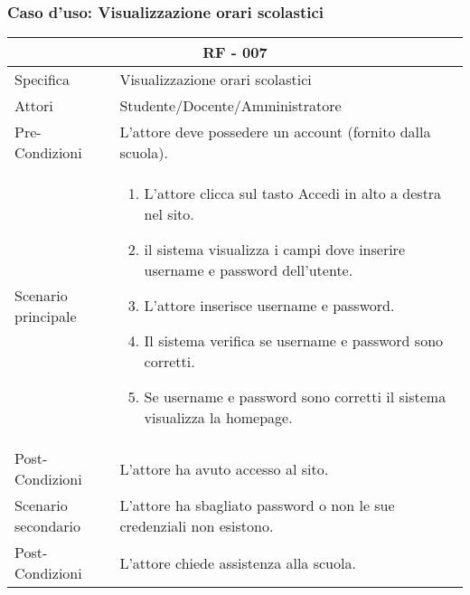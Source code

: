 \documentclass{article}
\begin{document}
\subsubsection{\textbf{Caso d'uso: Visualizzazione orari scolastici}}
\begin{tabular}{ |p{3cm}|p{9cm}|  }
	\hline
	\multicolumn{2}{|c|}{\textbf{RF - 007}} \\
	\hline
	Specifica& Visualizzazione orari scolastici\\
	\hline
	Attori& Studente/Docente/Amministratore\\
	\hline
	Pre-Condizioni& L'attore deve possedere un account (fornito dalla scuola).\\
	\hline
	Scenario principale& \begin{enumerate}
		\item L'attore clicca sul tasto Accedi in alto a destra nel sito.
		\item il sistema visualizza i campi dove inserire username e password dell'utente.
		\item L'attore inserisce username e password.
		\item Il sistema verifica se username e password sono corretti.
		\item Se username e password sono corretti il sistema visualizza la homepage.
	\end{enumerate}\\
	\hline
	Post-Condizioni& L'attore ha avuto accesso al sito.\\
	\hline
	Scenario secondario& L'attore ha sbagliato password o non le sue credenziali non esistono.\\
	\hline
	Post-Condizioni& L'attore chiede assistenza alla scuola.\\
	\hline
\end{tabular}
\normalsize
\flushleft
\vspace{4mm} 
\end{document}
